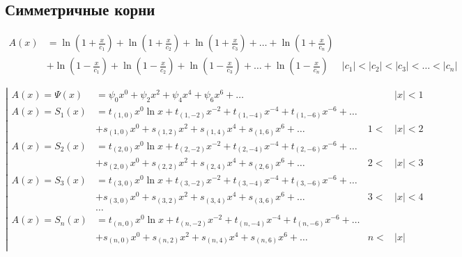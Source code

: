 
\subsection{Симметричные корни}

\begin{equation*} \begin{aligned}
A(x) &=
  \ln{\left(1 + \frac{x}{c_1} \right)}
+ \ln{\left(1 + \frac{x}{c_2} \right)}
+ \ln{\left(1 + \frac{x}{c_3} \right)}
+ \ldots
+ \ln{\left(1 + \frac{x}{c_n} \right)} \\ &
+ \ln{\left(1 - \frac{x}{c_1} \right)}
+ \ln{\left(1 - \frac{x}{c_2} \right)}
+ \ln{\left(1 - \frac{x}{c_3} \right)}
+ \ldots
+ \ln{\left(1 - \frac{x}{c_n} \right)}
&|c_1| < |c_2| < |c_3| < \ldots < |c_n|
\end{aligned} \end{equation*}

\begin{equation*} \left| \begin{aligned}
A(x) = \Psi(x) &=
  \psi_0 x^0
+ \psi_2 x^2
+ \psi_4 x^4
+ \psi_6 x^6
+ \ldots &
&|x| < 1 \\
%
A(x) = S_1(x) &= 
  t_{(1,0)} x^0 \ln{x}
+ t_{(1,-2)} x^{-2}
+ t_{(1,-4)} x^{-4}
+ t_{(1,-6)} x^{-6}
+ \ldots \\ &
+ s_{(1,0)} x^0
+ s_{(1,2)} x^2
+ s_{(1,4)} x^4
+ s_{(1,6)} x^6
+ \ldots &
1 < &|x| < 2 \\
%
A(x) = S_2(x) &= 
  t_{(2,0)} x^0 \ln{x}
+ t_{(2,-2)} x^{-2}
+ t_{(2,-4)} x^{-4}
+ t_{(2,-6)} x^{-6}
+ \ldots \\ &
+ s_{(2,0)} x^0
+ s_{(2,2)} x^2
+ s_{(2,4)} x^4
+ s_{(2,6)} x^6
+ \ldots &
2 < &|x| < 3 \\
%
A(x) = S_3(x) &= 
  t_{(3,0)} x^0 \ln{x}
+ t_{(3,-2)} x^{-2}
+ t_{(3,-4)} x^{-4}
+ t_{(3,-6)} x^{-6}
+ \ldots \\ &
+ s_{(3,0)} x^0
+ s_{(3,2)} x^2
+ s_{(3,4)} x^4
+ s_{(3,6)} x^6
+ \ldots &
3 < &|x| < 4 \\
%
&\ldots \\
%
A(x) = S_n(x) &= 
  t_{(n,0)} x^0 \ln{x}
+ t_{(n,-2)} x^{-2}
+ t_{(n,-4)} x^{-4}
+ t_{(n,-6)} x^{-6}
+ \ldots \\ &
+ s_{(n,0)} x^0
+ s_{(n,2)} x^2
+ s_{(n,4)} x^4
+ s_{(n,6)} x^6
+ \ldots &
n < &|x| \\
\end{aligned} \right. \end{equation*}

